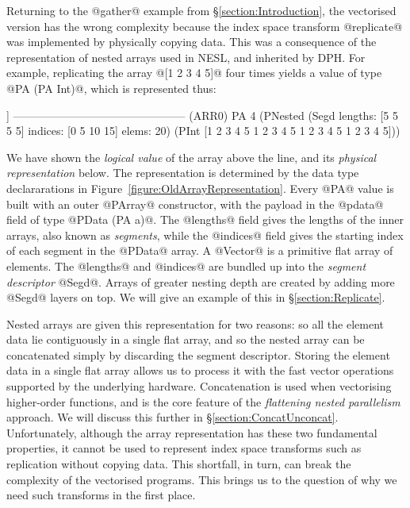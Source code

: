 Returning to the @gather@ example from \S\ref{section:Introduction}, the vectorised version has the wrong complexity because the index space transform @replicate@ was implemented by physically copying data. This was a consequence of the representation of nested arrays used in NESL, and inherited by DPH. For example, replicating the array @[1 2 3 4 5]@ four times yields a value 
of type @PA (PA Int)@, which is represented thus:

\begin{small}
\begin{code}
  [[1 2 3 4 5] [1 2 3 4 5] [1 2 3 4 5] [1 2 3 4 5]]
 ----------------------------------------------- (ARR0)
  PA 4 (PNested
   (Segd lengths: [5 5 5 5] indices: [0 5 10 15]
           elems: 20)
   (PInt [1 2 3 4 5 1 2 3 4 5 1 2 3 4 5 1 2 3 4 5]))
\end{code}
\end{small}

We have shown the \emph{logical value} of the array above the line, and its \emph{physical representation} below. The representation is determined by the data type declararations in Figure~\ref{figure:OldArrayRepresentation}.  Every @PA@ value is built with an outer @PArray@ constructor,
with the payload in the @pdata@ field of type @PData (PA a)@.  The @lengths@ field gives the lengths of the inner arrays, also known as \emph{segments}, while the @indices@ field gives the starting index of each segment in the @PData@ array. A @Vector@ is a primitive flat array of elements. The @lengths@ and @indices@ are bundled up into the \emph{segment descriptor} @Segd@. Arrays of greater nesting depth are created by adding more @Segd@ layers on top. We will give an example of this in \S\ref{section:Replicate}.

Nested arrays are given this representation for two reasons: so all the element data lie contiguously in a single flat array, and so the nested array can be concatenated simply by discarding the segment descriptor. Storing the element data in a single flat array allows us to process it with the fast vector operations supported by the underlying hardware. Concatenation is used when vectorising higher-order functions, and is the core feature of the \emph{flattening nested parallelism} approach. We will discuss this further in \S\ref{section:ConcatUnconcat}. Unfortunately, although the array representation has these two fundamental properties, it cannot be used to represent index space transforms such as replication without copying data. This shortfall, in turn, can break the complexity of the vectorised programs. This brings us to the question of why we need such transforms in the first place.


